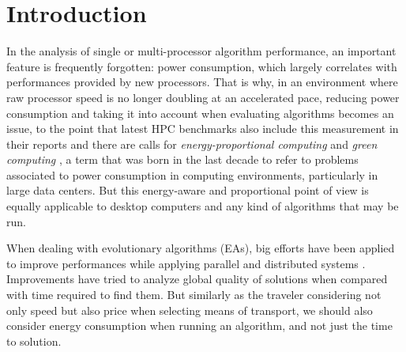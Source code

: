 \section{Introduction}


In the analysis of single or multi-processor algorithm performance, an
important feature 
is frequently forgotten:  power consumption, which largely correlates
with performances provided by new processors. That is why, in an
environment where raw processor speed is no longer doubling at an
accelerated pace, reducing power consumption and taking it into
account when evaluating algorithms becomes an issue, to the point that
latest HPC benchmarks also include this measurement in their reports
and there are calls for {\em energy-proportional computing}
\cite{barroso2007} and 
\textit{green computing} \cite{hooper2008}, a term that was born in the last decade to refer
to problems associated to power consumption in computing environments,
particularly in large data centers. But this
energy-aware and proportional point of view is equally applicable to desktop computers
and any kind of algorithms that may be run. 

When dealing with evolutionary algorithms (EAs), big efforts have been
applied to improve performances while applying parallel and
distributed systems \cite{paba2012}.  Improvements have tried to analyze
global quality of solutions when compared with time required to find
them.   
But similarly as the traveler considering not only speed but also
price when selecting means of transport, we should also consider
energy consumption when running an algorithm, and not just the time to
solution.  %

